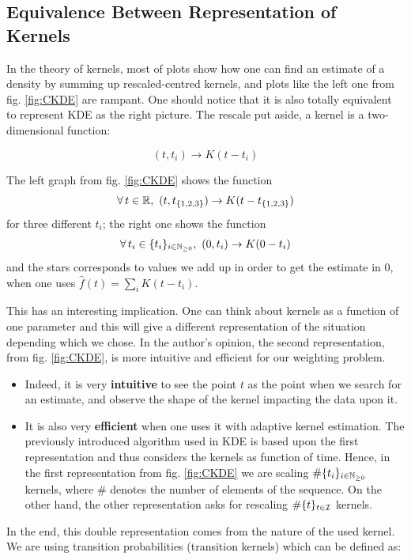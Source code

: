 \subsection{Equivalence Between Representation of Kernels}
\label{section:equivalence_bi_rep}

In the theory of kernels, most of plots show how one can find an estimate of a density by summing up rescaled-centred kernels, and plots like the left one from fig. \ref{fig:CKDE} are rampant. One should notice that it is also totally equivalent to represent KDE as the right picture. The rescale put aside, a kernel is a two-dimensional function: 

\begin{equation*}
(t,t_i) \to K(t - t_i) 
\end{equation*}

The left graph from fig. \ref{fig:CKDE} shows the function 
$$ \forall t \in \R, \ (t,t_{ \{1,2,3 \} }) \to K(t- t_{ \{1,2,3 \} }) $$ 
for three different $t_i$; the right one shows the function
$$ \forall t_i \in \sequence{ t_i }, \ (0,t_i ) \to K(0 - t_i) $$ 
and the stars corresponds to values we add up in order to get the estimate in $0$, when one uses $\hat{f}(t) = \sum_i K(t-t_i)$. 

This has an interesting implication. One can think about kernels as a function of one parameter and this will give a different representation of the situation depending which we chose. In the author's opinion, the second representation, from fig. \ref{fig:CKDE}, is more intuitive and efficient for our weighting problem. 

\begin{itemize}
\item Indeed, it is very \textbf{intuitive} to see the point $t$ as the point when we search for an estimate, and observe the shape of the kernel impacting the data upon it. 
\item It is also very \textbf{efficient} when one uses it with adaptive kernel estimation. The previously introduced algorithm used in KDE is based upon the first representation and thus considers the kernels as function of time. Hence, in the first representation from fig. \ref{fig:CKDE} we are scaling $\# \{ t_i \}_{ i \in \mathbb{N}_{\geq 0}}$ kernels, where $\#$ denotes the number of elements of the sequence. On the other hand, the other representation asks for rescaling $\#\{t\}_{t \in \mathcal I}$ kernels. 
\end{itemize}


In the end, this double representation comes from the nature of the used kernel. We are using transition probabilities (transition kernels) which can be defined as:

